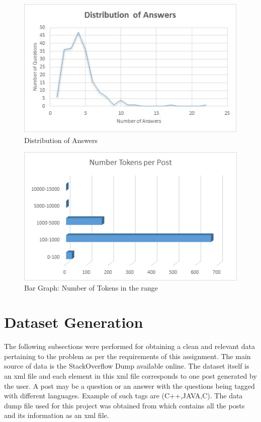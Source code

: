 \documentclass{sig-alternate-05-2015}
\begin{document}
\begin{figure}
\centering
  \includegraphics[width=0.75\linewidth]{AnswerDistribution.jpg}
  \caption{Distribution of Answers}
  \label{fig:distribution}
\end{figure}

\begin{figure}
\centering
  \includegraphics[width=0.75\linewidth]{NumberTokens.png}
  \caption{Bar Graph: Number of Tokens in the range}
  \label{fig:tokens}
\end{figure}

\section{Dataset Generation}
The following subsections were performed for obtaining a clean and relevant data pertaining to the problem as per the requirements of this assignment. The main source of data is the StackOverflow Dump available online. The dataset itself is an xml file and each element in this xml file corresponds to one post generated by the user. A post may be a question or an answer with the questions being tagged with different languages. Example of such tags are (C++,JAVA,C). The data dump file used for this project was obtained from \cite{stackexchange} which contains all the posts and its information as an xml file.
\end{document}
